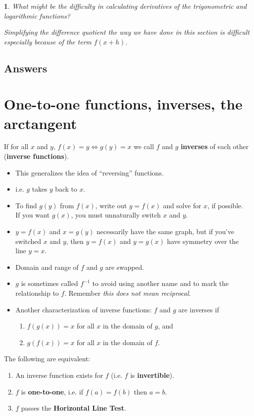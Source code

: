 \documentclass{amsbook}
\newtheorem{exc}{}
\newenvironment{ex}{\begin{exc}\normalfont}{\end{exc}}
\numberwithin{section}{chapter}
\numberwithin{equation}{chapter}
\newcommand{\qi}[1]{\begin{itemize}\item #1 \end{itemize}}
\begin{document}
\begin{ex}
	What might be the difficulty in calculating derivatives of the trigonometric and logarithmic functions?
	\begin{sol}
		Simplifying the difference quotient the way we have done in this section is difficult especially because of the term $f(x+h)$.
	\end{sol}
\end{ex}


\subsection*{Answers \nopunct} \hfill
\begin{multicols}{2}
	
\end{multicols}

\newpage
\section{One-to-one functions, inverses, the arctangent}

If for all $x$ and $y$, $f(x)=y \iff g(y) = x$ we call $f$ and $g$ \textbf{inverses} of each other (\textbf{inverse functions}).
\qi{This generalizes the idea of ``reversing'' functions.}
\qi{i.e. $g$ takes $y$ back to $x$.}
\qi{To find $g(y)$ from $f(x)$, write out $y=f(x)$ and solve for $x$, if possible. If you want $g(x)$, you must unnaturally switch $x$ and $y$.}
\qi{$y=f(x)$ and $x=g(y)$ necessarily have the same graph, but if you've switched $x$ and $y$, then $y=f(x)$ and $y=g(x)$ have symmetry over the line $y=x$.}
\qi{Domain and range of $f$ and $g$ are swapped.}
\qi{$g$ is sometimes called $f^{-1}$ to avoid using another name and to mark the relationship to $f$. Remember \textit{this does not mean reciprocal}.}
\qi{Another characterization of inverse functions: $f$ and $g$ are inverses if
\begin{enumerate}
	\item $f(g(x)) = x$ for all $x$ in the domain of $g$, and
	\item$g(f(x)) = x$ for all $x$ in the domain of $f$.
\end{enumerate}
}

The following are equivalent:
\begin{enumerate}
	\item An inverse function exists for $f$ (i.e. $f$ is \textbf{invertible}).
	\item $f$ is \textbf{one-to-one}, i.e. if $f(a)=f(b)$ then $a=b$.
	\item $f$ passes the \textbf{Horizontal Line Test}.
\end{enumerate}
\end{document}
